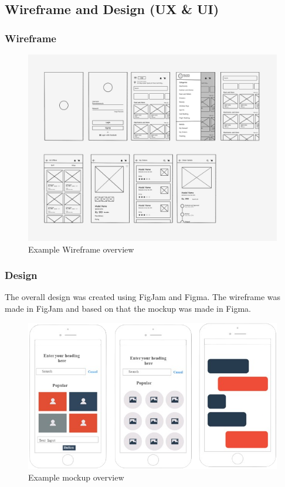 \documentclass[12pt,a4paper]{article}
\begin{document}
\begin{spacing}{1.5}
    \newpage
    \subsection{Wireframe and Design (UX \& UI)}\label{subseq:wireframe-and-design}
    \subsubsection{Wireframe}
    \begin{figure}[h]
        \centering
        \includegraphics[width=1\linewidth]{assets/wireframe-example.png}
        \caption{Example Wireframe overview}
    \end{figure}
    \FloatBarrier

    \newpage
    \subsubsection{Design}
    The overall design was created using FigJam and Figma. The wireframe was made
    in FigJam and based on that the mockup was made in Figma.

    \begin{figure}[H]
        \centering
        \includegraphics[width=1\linewidth]{assets/mockup-example.png}
        \caption{Example mockup overview}
    \end{figure}
    \FloatBarrier


\end{spacing}
\end{document}
